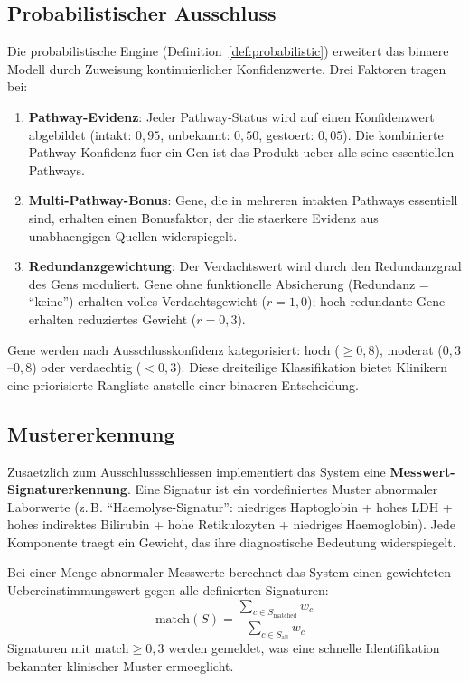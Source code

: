 \documentclass[12pt,a4paper]{article}
\begin{document}
\subsection{Probabilistischer Ausschluss}

Die probabilistische Engine (Definition~\ref{def:probabilistic}) erweitert das binaere Modell durch Zuweisung kontinuierlicher Konfidenzwerte. Drei Faktoren tragen bei:

\begin{enumerate}
    \item \textbf{Pathway-Evidenz}: Jeder Pathway-Status wird auf einen Konfidenzwert abgebildet (intakt: $0{,}95$, unbekannt: $0{,}50$, gestoert: $0{,}05$). Die kombinierte Pathway-Konfidenz fuer ein Gen ist das Produkt ueber alle seine essentiellen Pathways.
    \item \textbf{Multi-Pathway-Bonus}: Gene, die in mehreren intakten Pathways essentiell sind, erhalten einen Bonusfaktor, der die staerkere Evidenz aus unabhaengigen Quellen widerspiegelt.
    \item \textbf{Redundanzgewichtung}: Der Verdachtswert wird durch den Redundanzgrad des Gens moduliert. Gene ohne funktionelle Absicherung (Redundanz = "`keine"') erhalten volles Verdachtsgewicht ($r = 1{,}0$); hoch redundante Gene erhalten reduziertes Gewicht ($r = 0{,}3$).
\end{enumerate}

Gene werden nach Ausschlusskonfidenz kategorisiert: hoch ($\geq 0{,}8$), moderat ($0{,}3$--$0{,}8$) oder verdaechtig ($< 0{,}3$). Diese dreiteilige Klassifikation bietet Klinikern eine priorisierte Rangliste anstelle einer binaeren Entscheidung.

\subsection{Mustererkennung}

Zusaetzlich zum Ausschlussschliessen implementiert das System eine \textbf{Messwert-Signaturerkennung}. Eine Signatur ist ein vordefiniertes Muster abnormaler Laborwerte (z.\,B. "`Haemolyse-Signatur"': niedriges Haptoglobin + hohes LDH + hohes indirektes Bilirubin + hohe Retikulozyten + niedriges Haemoglobin). Jede Komponente traegt ein Gewicht, das ihre diagnostische Bedeutung widerspiegelt.

Bei einer Menge abnormaler Messwerte berechnet das System einen gewichteten Uebereinstimmungswert gegen alle definierten Signaturen:
\begin{equation}
    \text{match}(S) = \frac{\sum_{c \in S_{\text{matched}}} w_c}{\sum_{c \in S_{\text{all}}} w_c}
\end{equation}
Signaturen mit $\text{match} \geq 0{,}3$ werden gemeldet, was eine schnelle Identifikation bekannter klinischer Muster ermoeglicht.
\end{document}
